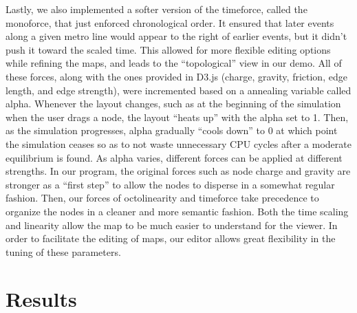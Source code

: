 \documentclass{chi2009}
\begin{document}
Lastly, we also implemented a softer version of the timeforce, called the monoforce, that just enforced chronological order.  It ensured that later events along a given metro line would appear to the right of earlier events, but it didn’t push it toward the scaled time.  This allowed for more flexible editing options while refining the maps, and leads to the “topological” view in our demo.
All of these forces, along with the ones provided in D3.js (charge, gravity, friction, edge length, and edge strength), were incremented based on a annealing variable called alpha.  Whenever the layout changes, such as at the beginning of the simulation when the user drags a node, the layout “heats up” with the alpha set to 1.  Then, as the simulation progresses, alpha gradually “cools down” to 0 at which point the simulation ceases so as to not waste unnecessary CPU cycles after a moderate equilibrium is found.  As alpha varies, different forces can be applied at different strengths.  In our program, the original forces such as node charge and gravity are stronger as a “first step” to allow the nodes to disperse in a somewhat regular fashion.  Then, our forces of octolinearity and timeforce take precedence to organize the nodes in a cleaner and more semantic fashion.  Both the time scaling and linearity allow the map to be much easier to understand for the viewer.  In order to facilitate the editing of maps, our editor allows great flexibility in the tuning of these parameters.  

\section{Results}
\end{document}
